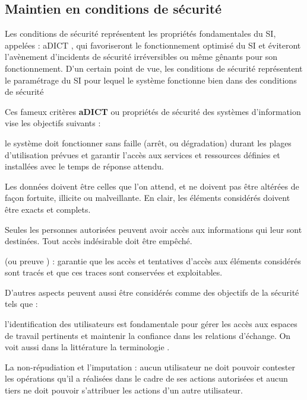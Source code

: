 \subsection{Maintien en conditions de sécurité}

Les conditions de sécurité représentent les propriétés fondamentales du SI, appelées : \gls{aDICT} , qui favoriseront le fonctionnement optimisé du SI et éviteront l'avènement d'incidents de sécurité irréversibles ou même gênants pour son fonctionnement. D'un certain point de vue, les conditions de sécurité représentent le paramétrage du SI pour lequel le système fonctionne bien dans des conditions de sécurité 

Ces fameux critères \textbf{\gls{aDICT}} ou propriétés de sécurité des systèmes d'information vise les objectifs suivants :
\begin{nota}[DISPONIBILITE]
le système doit fonctionner sans faille (arrêt, ou dégradation) durant les plages d'utilisation prévues et garantir l'accès aux services et ressources définies et installées avec le temps de réponse attendu.
\end{nota}
\begin{nota}[INTEGRITE]
Les données doivent être celles que l'on attend, et ne doivent pas être altérées de façon fortuite, illicite ou malveillante. En clair, les éléments considérés doivent être exacts et complets.
\end{nota}
\begin{nota}[CONFIDENTIALITE] Seules les personnes autorisées peuvent avoir accès aux informations qui leur sont destinées. Tout accès indésirable doit être empêché.
\end{nota}
\begin{nota}[TRACABILITE] (ou preuve ) : garantie que les accès et tentatives d'accès aux éléments considérés sont tracés et que ces traces sont conservées et exploitables.
\end{nota}
D'autres aspects peuvent aussi être considérés comme des objectifs de la sécurité tels que :
\begin{nota}[AUTHENTICITE]
l'identification des utilisateurs est fondamentale pour gérer les accès aux espaces de travail pertinents et maintenir la confiance dans les relations d'échange. On voit aussi dans la littérature la terminologie .
\end{nota}
\begin{nota}
La non-répudiation et l'imputation : aucun utilisateur ne doit pouvoir contester les opérations qu'il a réalisées dans le cadre de ses actions autorisées et aucun tiers ne doit pouvoir s'attribuer les actions d'un autre utilisateur.
\end{nota}

